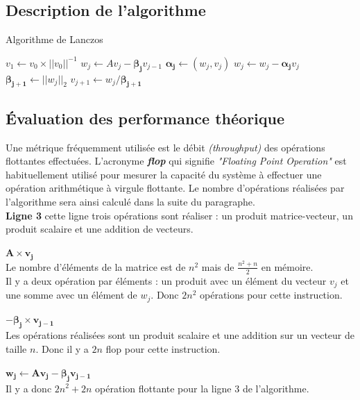\documentclass[11pt,french]{article}
\begin{document}
	\subsection{Description de l'algorithme}
	\begin{algorithm}
		\caption{Algorithme de Lanczos}\label{alg:lanczos}
		\begin{algorithmic}[1]
			\State $v_1 \gets v_0 \times|| v_0||^{-1} $
				\State $w_j \gets Av_j - \boldsymbol{\beta_j }v_{j-1}$
				\State $\boldsymbol{\alpha_j} \gets (w_j,v_j)$
				\State $w_j \gets w_j - \boldsymbol{\alpha_j} v_j$
				\State $\boldsymbol{\beta_{j+1}} \gets || w_j||_2$
				\State $ v_{j+1} \gets w_j /\boldsymbol{\beta_{j+1}} $
			\EndFor
			\State \Return 
		\end{algorithmic}
	\end{algorithm}
	
	\subsection{Évaluation des performance théorique}
	Une métrique fréquemment utilisée est le débit \emph{(throughput)} des opérations flottantes effectuées. L’acronyme \textbf{\emph{flop}} qui signifie \emph{"Floating Point Operation"} est habituellement utilisé pour mesurer la capacité du système à effectuer une opération arithmétique à virgule flottante. Le nombre d'opérations réalisées par l'algorithme sera ainsi calculé dans la suite du paragraphe.  \\

	\noindent \textbf{Ligne  3}
	cette ligne trois opérations sont réaliser : un produit matrice-vecteur, un produit scalaire et une addition de vecteurs. \\ \\
	$\boldsymbol{ A \times v_j}$\\
	Le nombre d’éléments de la matrice est de $n^2$ mais de $\frac{n^2 + n}{2}$  en mémoire.\\
	Il y a deux opération par éléments :  un produit avec un élément du vecteur  $v_j$ et une somme avec un élément de $w_j$.
	Donc $2n^2$ opérations pour cette instruction. \\ \\
	$\boldsymbol{ - \beta_j \times v_{j - 1}}$\\
	Les opérations réalisées sont un produit scalaire et une addition sur un vecteur de taille $n$.
	Donc il y a $2n$ flop pour cette instruction. \\  \\
	\noindent $\boldsymbol{w_j \gets Av_j - \beta_j  v_{j-1}}$ \\
	Il y a donc $2n^2 + 2n$ opération flottante pour la ligne 3 de l'algorithme.  \\
	
\end{document}
